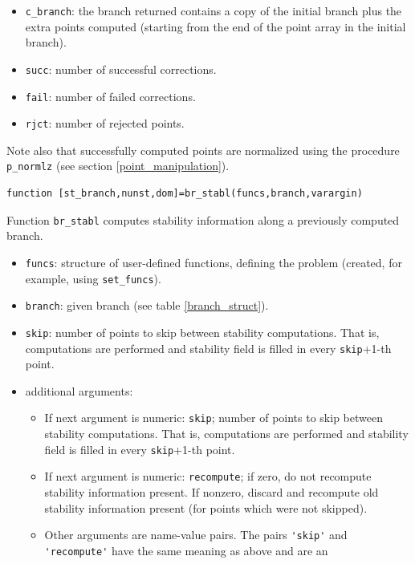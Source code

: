 \documentclass[10pt]{scrartcl}
\newcommand{\blist}[1]{\mbox{\lstinline!#1!}}
\begin{document}
{\begin{itemize}
\item \blist{c_branch}:
the branch returned contains a copy of the initial branch plus
the extra points computed (starting from the end of the point array in the
initial branch). 
\item \blist{succ}: number of successful corrections.
\item \blist{fail}: number of failed corrections.
\item \blist{rjct}: number of rejected points.
\end{itemize}
Note also that successfully computed points are normalized using the procedure
\blist{p_normlz} (see section \ref{point_manipulation}). 
\begin{lstlisting}
function [st_branch,nunst,dom]=br_stabl(funcs,branch,varargin)  
\end{lstlisting}
\noindent Function \blist{br_stabl} computes stability information
along a previously computed branch. 
\begin{itemize}
\item \blist{funcs}: structure of user-defined functions, defining the
  problem (created, for example, using \blist{set_funcs}).
\item \blist{branch}: given branch (see table \ref{branch_struct}).
\item \blist{skip}: number of points to skip between stability
  computations.  That is, computations are performed and stability
  field is filled in every \blist{skip}+1-th point.
\item additional arguments:
  \begin{itemize}
  \item If next argument is numeric: \blist{skip}; number of points to
    skip between stability computations.  That is, computations are
    performed and stability field is filled in every \blist{skip}+1-th
    point.
  \item If next argument is numeric: \blist{recompute}; if zero, do
    not recompute stability information present. If nonzero, discard
    and recompute old stability information present (for points which
    were not skipped).
  \item Other arguments are name-value pairs. The pairs \blist{'skip'}
    and \blist{'recompute'} have the same meaning as above and are an

\end{itemize}
\end{itemize}}
\end{document}
